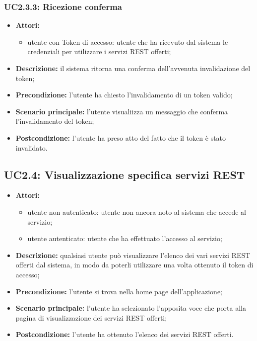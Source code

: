 \subsubsection{UC2.3.3: Ricezione conferma}
\begin{itemize}
	\item \textbf{Attori:}
	\begin{itemize}
		\item utente con Token di accesso: utente che ha ricevuto dal sistema le credenziali per utilizzare i servizi REST offerti;
	\end{itemize}
	\item \textbf{Descrizione:} il sistema ritorna una conferma dell'avvenuta invalidazione del token;
	\item \textbf{Precondizione:} l'utente ha chiesto l'invalidamento di un token valido;
	\item \textbf{Scenario principale:} l'utente visualiizza un messaggio che conferma l'invalidamento del token;
	\item \textbf{Postcondizione:} l'utente ha preso atto del fatto che il token è stato invalidato.
\end{itemize}

\subsection{UC2.4: Visualizzazione specifica servizi REST}
\begin{itemize}
	\item \textbf{Attori:}
	\begin{itemize}
		\item utente non autenticato: utente non ancora noto al sistema che accede al servizio;
		\item utente autenticato: utente che ha effettuato l'accesso al servizio;
	\end{itemize}
	\item \textbf{Descrizione:} qualsiasi utente può visualizzare l'elenco dei vari servizi REST offerti dal sistema, in modo da poterli utilizzare una volta ottenuto il token di accesso;
	\item \textbf{Precondizione:} l'utente si trova nella home page dell'applicazione;
	\item \textbf{Scenario principale:} l'utente ha selezionato l'apposita voce che porta alla pagina di visualizzazione dei servizi REST offerti;
	\item \textbf{Postcondizione:} l'utente ha ottenuto l'elenco dei servizi REST offerti.
\end{itemize}

\pagebreak
